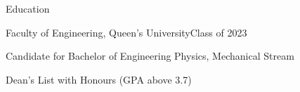 \documentclass{resume} %
\begin{document}



\begin{rSection}{Education}

\begin{rSubsection}{Faculty of Engineering, Queen's University}{Class of 2023}{}{}
\item Candidate for Bachelor of Engineering Physics, Mechanical Stream
\item Dean's List with Honours (GPA above 3.7)
\end{rSubsection}
\end{rSection}
\end{document}
